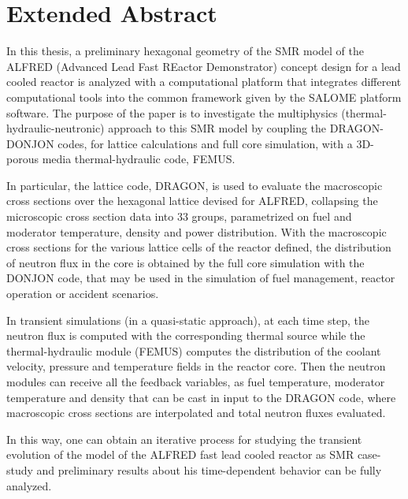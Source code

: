 \chapter*{Extended Abstract}
In this thesis, a preliminary hexagonal geometry of the  SMR model of the ALFRED (Advanced Lead Fast REactor Demonstrator) concept design for a lead cooled reactor is analyzed with a computational platform that integrates different computational tools into the common framework given by the SALOME platform software. The purpose of the paper is to investigate the multiphysics (thermal-hydraulic-neutronic) approach to this SMR model by coupling the DRAGON-DONJON codes, for lattice calculations and full core simulation, with a 3D-porous media thermal-hydraulic code, FEMUS. 

In particular, the lattice code, DRAGON, is used to evaluate the macroscopic cross sections over the hexagonal lattice devised for ALFRED, collapsing the microscopic cross section data into 33 groups, parametrized on fuel and moderator temperature, density and power distribution. With the macroscopic cross sections for the various lattice cells of the reactor defined, the distribution of neutron flux in the core is obtained by the full core simulation with the DONJON code, that may be used in the simulation of fuel management, reactor operation or accident scenarios. 

In transient simulations (in a quasi-static approach), at each time step, the neutron flux is computed with the corresponding thermal source while the thermal-hydraulic module (FEMUS) computes the distribution of the coolant velocity, pressure and temperature fields in the reactor core. Then the neutron modules can receive all the feedback variables, as fuel temperature, moderator temperature and density that can be cast in input to the DRAGON code, where macroscopic cross sections are interpolated and total neutron fluxes evaluated. 

In this way, one can obtain an iterative process for studying the transient evolution of the model of the ALFRED fast lead cooled reactor as SMR case-study and preliminary results about his time-dependent behavior can be fully analyzed.